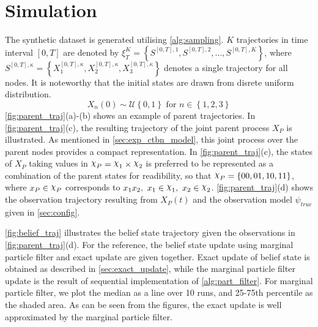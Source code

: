 \section{Simulation}
\label{sec:simulation}
The synthetic dataset is generated utilising \cref{alg:sampling}. $ K $ trajectories in time interval $ [0, T] $ are denoted by $ \xi^K_T = \left\lbrace S^{[0,T], 1}, S^{[0,T], 2}, ..., S^{[0,T], K} \right\rbrace  $, where $ S^{[0,T],\kappa} = \left\lbrace X_1^{[0,T],\kappa} , X_2^{[0,T],\kappa}, X_3^{[0,T],\kappa}\right\rbrace $ denotes a single trajectory for all nodes. It is noteworthy that the initial states are drawn from disrete uniform distribution.
\begin{equation}
X_n(0) \sim \mathcal{U} \left\lbrace 0, 1\right\rbrace  \text{ for } n \in \left\lbrace 1,2,3\right\rbrace 
\end{equation}
\autoref{fig:parent_traj}(a)-(b) shows an example of parent trajectories. In \autoref{fig:parent_traj}(c), the resulting trajectory of the joint parent process $ X_P $ is illustrated. As mentioned in \cref{sec:exp_ctbn_model}, this joint process over the parent nodes provides a compact representation. In \autoref{fig:parent_traj}(c), the states of $ X_P $ taking values in $ \rchi_P = \rchi_1 \times \rchi_2 $ is preferred to be represented as a combination of the parent states for readibility, so that $ \rchi_P = \left\lbrace 00, 01, 10, 11\right\rbrace  $, where $ x_P \in \rchi_P $ corresponds to $ x_1x_2,\ x_1\in \rchi_1,\  x_2\in \rchi_2 $. \autoref{fig:parent_traj}(d) shows the observation trajectory resulting from $ X_P(t) $ and the observation model $ \psi_{true} $ given in \cref{sec:config}. \par
\autoref{fig:belief_traj} illustrates the belief state trajectory given the observations in \autoref{fig:parent_traj}(d). For the reference, the belief state update using marginal particle filter and exact update are given together. Exact update of belief state is obtained as described in \cref{sec:exact_update}, while the marginal particle filter update is the result of sequential implementation of \cref{alg:part_filter}. For marginal particle filter, we plot the median as a line over 10 runs, and 25-75th percentile as the shaded area. As can be seen from the figures, the exact update is well approximated by the marginal particle filter.
